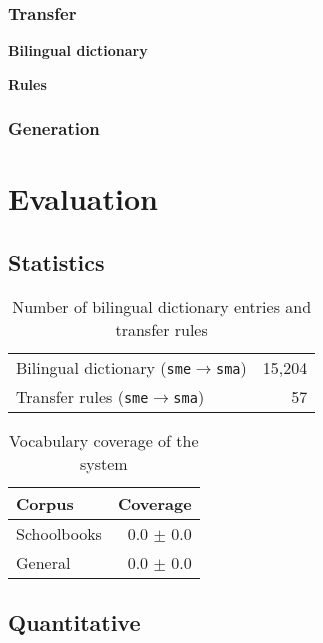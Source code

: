 \documentclass[a4paper,11pt,twocolumn]{article}
\begin{document}
\subsubsection{Transfer}

\textbf{Bilingual dictionary}

\textbf{Rules}

\subsubsection{Generation}

\section{Evaluation}

\subsection{Statistics}

\begin{table}
  \begin{center}
    \begin{tabular}{|l|r|}
      \hline
      Bilingual dictionary ({\tt sme}$\rightarrow${\tt sma}) & 15,204 \\ %
      Transfer rules ({\tt sme}$\rightarrow${\tt sma}) & 57 \\
      \hline
    \end{tabular}
    \label{table:transfer}
    \caption{Number of bilingual dictionary entries and transfer rules}
  \end{center}
\end{table}

\begin{table}
  \begin{center}
    \begin{tabular}{|l|r|}
      \hline
      \textbf{Corpus} & \textbf{Coverage}  \\
      \hline
      Schoolbooks     & 0.0 $\pm$ 0.0 \\
      General         & 0.0 $\pm$ 0.0 \\
      \hline
    \end{tabular}
    \label{table:coverage}
    \caption{Vocabulary coverage of the system}
  \end{center}
\end{table}

\subsection{Quantitative}
\end{document}

